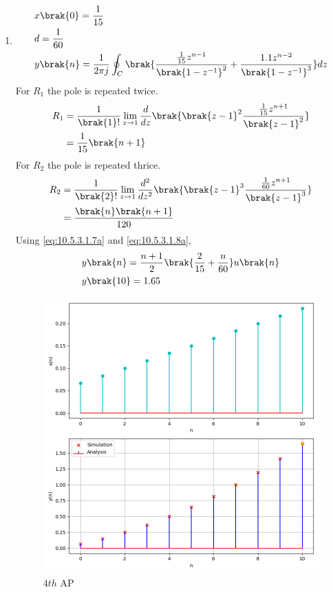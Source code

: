 \documentclass[journal,12pt,twocolumn]{IEEEtran}
\theoremstyle{remark}
\begin{document}
\begin{enumerate}[label=(\alph*)]
\item \begin{align}
        &x\brak{0}=\frac{1}{15} \\
        &d=\frac{1}{60} \\
        &y\brak{n}=\frac{1}{2\pi j}\oint_{C}\brak{\dfrac{\frac{1}{15}z^{n-1}}{\brak{1-z^{-1}}^2} + \dfrac{1.1z^{n-2}}{\brak{1-z^{-1}}^{3}}}dz
    \end{align}
    For $R_1$ the pole is repeated twice.
\begin{align}
    R_1&=\frac{1}{\brak {1}!}\lim\limits_{z\to 1}\frac{d}{dz}\brak {{\brak{z-1}}^{2}\frac{\frac{1}{15}z^{n+1}}{{\brak{z-1}}^2}}\\
    &=\frac{1}{15}\brak{n+1}\label{eq:10.5.3.1.7a}
\end{align}
    For $R_2$ the pole is repeated thrice.
\begin{align}
    R_2&=\frac{1}{\brak {2}!}\lim\limits_{z\to 1}\frac{d^{2}}{dz^{2}}\brak {{\brak{z-1}}^{3}\frac{\frac{1}{60}z^{n+1}}{{\brak{z-1}}^3}}\\
    &=\frac{\brak{n}\brak{n+1}}{120}\label{eq:10.5.3.1.8a}
\end{align}
Using \eqref{eq:10.5.3.1.7a} and \eqref{eq:10.5.3.1.8a},
\begin{align}
    &y\brak{n}=\dfrac{n+1}{2}\brak{\frac{2}{15}+\frac{n}{60}}u\brak{n}\\
    &y\brak{10}=1.65
\end{align}
\begin{figure}[h!]
        \centering
        \includegraphics[width=\columnwidth]{ncert-maths/10/5/3/1/figs/plt4.png}
        \caption{$4th$ AP}
    \end{figure}
\end{enumerate}

\end{document}
